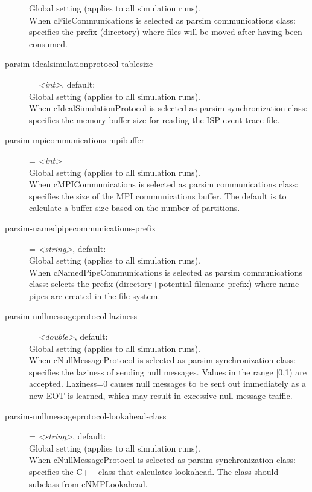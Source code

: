 \begin{description}
    Global setting (applies to all simulation runs).\\
    When cFileCommunications is selected as parsim communications class:
    specifies the prefix (directory) where files will be moved after having
    been consumed.
\item[parsim-idealsimulationprotocol-tablesize] = \textit{<int>}, default: \\
    Global setting (applies to all simulation runs).\\
    When cIdealSimulationProtocol is selected as parsim synchronization class:
    specifies the memory buffer size for reading the ISP event trace file.
\item[parsim-mpicommunications-mpibuffer] = \textit{<int>}\\
    Global setting (applies to all simulation runs).\\
    When cMPICommunications is selected as parsim communications class:
    specifies the size of the MPI communications buffer. The default is to
    calculate a buffer size based on the number of partitions.
\item[parsim-namedpipecommunications-prefix] = \textit{<string>}, default: \\
    Global setting (applies to all simulation runs).\\
    When cNamedPipeCommunications is selected as parsim communications class:
    selects the prefix (directory+potential filename prefix) where name pipes
    are created in the file system.
\item[parsim-nullmessageprotocol-laziness] = \textit{<double>}, default: \\
    Global setting (applies to all simulation runs).\\
    When cNullMessageProtocol is selected as parsim synchronization class:
    specifies the laziness of sending null messages. Values in the range [0,1)
    are accepted. Laziness=0 causes null messages to be sent out immediately as
    a new EOT is learned, which may result in excessive null message traffic.
\item[parsim-nullmessageprotocol-lookahead-class] = \textit{<string>}, default: \\
    Global setting (applies to all simulation runs).\\
    When cNullMessageProtocol is selected as parsim synchronization class:
    specifies the C++ class that calculates lookahead. The class should
    subclass from cNMPLookahead.

\end{description}
